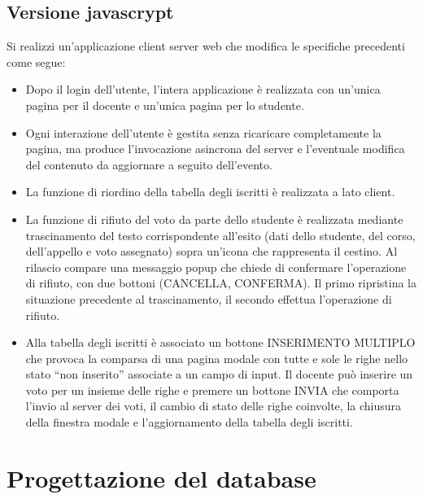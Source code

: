 \documentclass[a4paper,12pt]{scrreprt}
\begin{document}
\section{Versione javascrypt}
Si realizzi un’applicazione client server web che modifica le specifiche precedenti come segue:
\begin{itemize}
    \item Dopo il login dell’utente, l’intera applicazione è realizzata con un’unica pagina per il docente e un’unica pagina per lo studente.
    \item Ogni interazione dell’utente è gestita senza ricaricare completamente la pagina, ma produce l’invocazione
    asincrona del server e l’eventuale modifica del contenuto da aggiornare a seguito dell’evento.
    \item La funzione di riordino della tabella degli iscritti è realizzata a lato client.
    \item La funzione di rifiuto del voto da parte dello studente è realizzata mediante trascinamento del testo
    corrispondente all’esito (dati dello studente, del corso, dell’appello e voto assegnato) sopra un’icona che
    rappresenta il cestino. Al rilascio compare una messaggio popup che chiede di confermare l’operazione di
    rifiuto, con due bottoni (CANCELLA, CONFERMA). Il primo ripristina la situazione precedente al trascinamento,
    il secondo effettua l’operazione di rifiuto.
    \item Alla tabella degli iscritti è associato un bottone INSERIMENTO MULTIPLO che provoca la comparsa di una
    pagina modale con tutte e sole le righe nello stato “non inserito” associate a un campo di input. Il docente può
    inserire un voto per un insieme delle righe e premere un bottone INVIA che comporta l’invio al server dei voti,
    il cambio di stato delle righe coinvolte, la chiusura della finestra modale e l’aggiornamento della tabella degli
    iscritti.
\end{itemize}

\newpage
\chapter{Progettazione del database}
\end{document}
